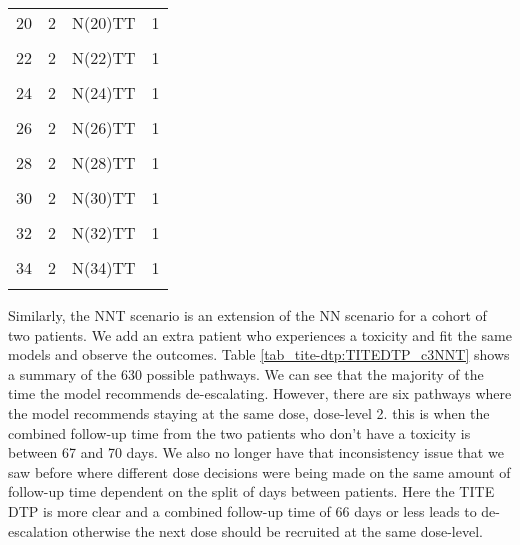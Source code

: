 \begin{table}[H]
{\begin{tabular}[t]{cccc}
			20 & 2 & N(20)TT & 1\\
			\cellcolor{gray!6}{21} & \cellcolor{gray!6}{2} & \cellcolor{gray!6}{N(21)TT} & \cellcolor{gray!6}{1}\\
			22 & 2 & N(22)TT & 1\\
			\cellcolor{gray!6}{23} & \cellcolor{gray!6}{2} & \cellcolor{gray!6}{N(23)TT} & \cellcolor{gray!6}{1}\\
			24 & 2 & N(24)TT & 1\\
			\cellcolor{gray!6}{25} & \cellcolor{gray!6}{2} & \cellcolor{gray!6}{N(25)TT} & \cellcolor{gray!6}{1}\\
			26 & 2 & N(26)TT & 1\\
			\cellcolor{gray!6}{27} & \cellcolor{gray!6}{2} & \cellcolor{gray!6}{N(27)TT} & \cellcolor{gray!6}{1}\\
			28 & 2 & N(28)TT & 1\\
			\cellcolor{gray!6}{29} & \cellcolor{gray!6}{2} & \cellcolor{gray!6}{N(29)TT} & \cellcolor{gray!6}{1}\\
			30 & 2 & N(30)TT & 1\\
			\cellcolor{gray!6}{31} & \cellcolor{gray!6}{2} & \cellcolor{gray!6}{N(31)TT} & \cellcolor{gray!6}{1}\\
			32 & 2 & N(32)TT & 1\\
			\cellcolor{gray!6}{33} & \cellcolor{gray!6}{2} & \cellcolor{gray!6}{N(33)TT} & \cellcolor{gray!6}{1}\\
			34 & 2 & N(34)TT & 1\\
			\cellcolor{gray!6}{35} & \cellcolor{gray!6}{2} & \cellcolor{gray!6}{NTT} & \cellcolor{gray!6}{1}\\
			\bottomrule
	\end{tabular}}
\end{table}

Similarly, the NNT scenario is an extension of the NN scenario for a cohort of two patients. We add an extra patient who experiences a toxicity and fit the same models and observe the outcomes. Table \ref{tab_tite-dtp:TITEDTP_c3NNT} shows a summary of the 630 possible pathways. We can see that the majority of the time the model recommends de-escalating. However, there are six pathways where the model recommends staying at the same dose, dose-level 2. this is when the combined follow-up time from the two patients who don't have a toxicity is between 67 and 70 days. We also no longer have that inconsistency issue that we saw before where different dose decisions were being made on the same amount of follow-up time dependent on the split of days between patients. Here the TITE DTP is more clear and a combined follow-up time of 66 days or less leads to de-escalation otherwise the next dose should be recruited at the same dose-level.

